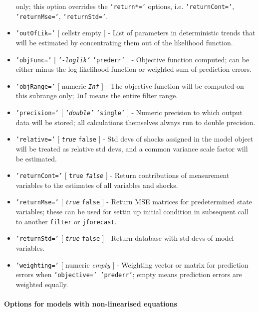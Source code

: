 \begin{itemize}
  only; this option overrides the \texttt{'return*='} options, i.e.
  \texttt{'returnCont='}, \texttt{'returnMse='}, \texttt{'returnStd='}.
\item
  \texttt{'outOfLik='} {[} cellstr \textbar{} empty {]} - List of
  parameters in deterministic trends that will be estimated by
  concentrating them out of the likelihood function.
\item
  \texttt{'objFunc='} {[} \emph{\texttt{'-loglik'}} \textbar{}
  \texttt{'prederr'} {]} - Objective function computed; can be either
  minus the log likelihood function or weighted sum of prediction
  errors.
\item
  \texttt{'objRange='} {[} numeric \textbar{} \emph{\texttt{Inf}} {]} -
  The objective function will be computed on this subrange only;
  \texttt{Inf} means the entire filter range.
\item
  \texttt{'precision='} {[} \emph{\texttt{'double'}} \textbar{}
  \texttt{'single'} {]} - Numeric precision to which output data will be
  stored; all calculations themselves always run to double precision.
\item
  \texttt{'relative='} {[} \emph{\texttt{true}} \textbar{}
  \texttt{false} {]} - Std devs of shocks assigned in the model object
  will be treated as relative std devs, and a common variance scale
  factor will be estimated.
\item
  \texttt{'returnCont='} {[} \texttt{true} \textbar{}
  \emph{\texttt{false}} {]} - Return contributions of measurement
  variables to the estimates of all variables and shocks.
\item
  \texttt{'returnMse='} {[} \emph{\texttt{true}} \textbar{}
  \texttt{false} {]} - Return MSE matrices for predetermined state
  variables; these can be used for settin up initial condition in
  subsequent call to another \texttt{filter} or \texttt{jforecast}.
\item
  \texttt{'returnStd='} {[} \emph{\texttt{true}} \textbar{}
  \texttt{false} {]} - Return database with std devs of model variables.
\item
  \texttt{'weighting='} {[} numeric \textbar{} \emph{empty} {]} -
  Weighting vector or matrix for prediction errors when
  \texttt{'objective=' 'prederr'}; empty means prediction errors are
  weighted equally.
\end{itemize}

\paragraph{Options for models with non-linearised
equations}

